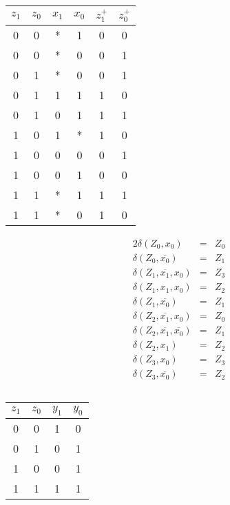 \documentclass[10pt,a4paper,oneside,ngerman,numbers=noenddot]{scrartcl}
\begin{document}
\subsection{} %
\begin{tabular}{cccc||cc}
$z_{1}$	& $z_{0}$ & $x_{1}$  & $x_{0}$ & $z_{1}^{+}$ & $z_{0}^{+}$ \\
\hline
0 & 0 & * & 1 & 0 & 0 \\
0 & 0 & * & 0 & 0 & 1 \\
0 & 1 & * & 0 & 0 & 1 \\
0 & 1 & 1 & 1 & 1 & 0 \\
0 & 1 & 0 & 1 & 1 & 1 \\
1 & 0 & 1 & * & 1 & 0 \\
1 & 0 & 0 & 0 & 0 & 1 \\
1 & 0 & 0 & 1 & 0 & 0 \\
1 & 1 & * & 1 & 1 & 1 \\
1 & 1 & * & 0 & 1 & 0 \\
\end{tabular}

\begin{alignat*}{2}
\delta(Z_{0}, x_{0}) &=& Z_{0}\\
\delta(Z_{0}, \overline{x_{0}}) &=& Z_{1}\\
\delta(Z_{1}, \overline{x_{1}}, x_{0}) &=& Z_{3}\\
\delta(Z_{1}, x_{1}, x_{0}) &=& Z_{2}\\
\delta(Z_{1}, \overline{x_{0}}) &=& Z_{1}\\
\delta(Z_{2}, \overline{x_{1}}, x_{0}) &=& Z_{0}\\
\delta(Z_{2}, \overline{x_{1}}, \overline{x_{0}}) &=& Z_{1}\\
\delta(Z_{2}, x_{1}) &=& Z_{2}\\
\delta(Z_{3}, x_{0}) &=& Z_{3}\\
\delta(Z_{3}, \overline{x_{0}}) &=& Z_{2}
\end{alignat*}
\subsection{} %
\begin{tabular}{cc||cc}
$z_{1}$	& $z_{0}$ & $y_{1}$ & $y_{0}$ \\
\hline
0 & 0 & 1 & 0 \\
0 & 1 & 0 & 1 \\
1 & 0 & 0 & 1 \\
1 & 1 & 1 & 1 \\
\end{tabular}
\end{document}
